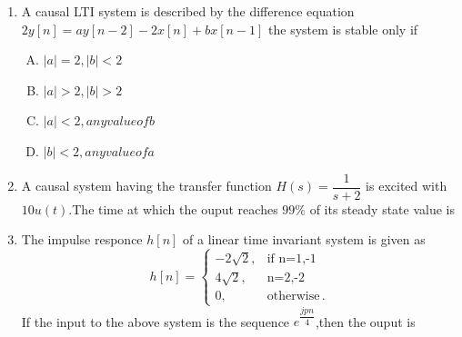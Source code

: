 \documentclass[journal,12pt,twocolumn]{IEEEtran}
\begin{document}
\begin{enumerate}
\begin{enumerate}[(A)]
\end{enumerate}

\item A causal LTI system is described by the difference equation $2y[n]=ay[n-2]-2x[n]+bx[n-1]$ \newline the system is stable only if
\begin{enumerate}[(A)]

\setlength\itemsep{2em}
\item $|a|=2,|b|<2$
\item $|a|>2,|b|>2$
\item $|a|<2,any value of b$
\item $|b|<2, any value of a$


\end{enumerate}

\item A causal system having the transfer function $H(s)=\dfrac{1}{s+2}$ is excited with $10u(t)$.The time at which the ouput reaches $99\%$ of its steady state value is
\begin{enumerate}[(A)]
\end{enumerate}





\item The impulse responce $h[n]$ of a linear time invariant system is given as
\[
	h[n]=\begin{cases}
		-2\sqrt{2}, & \text{if n=1,-1 }  \\
		4\sqrt{2}, & \text{n=2,-2 }\\
		0,&\text{otherwise}\,.
	\end{cases}
\] 
\newline If the input to the above system is the sequence $e^{\dfrac{jpn}{4}}$,then the ouput is

\begin{enumerate}[(A)]
\end{enumerate}


\end{enumerate}
\end{document}
